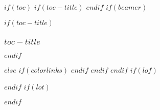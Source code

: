 
$if(toc)$
$if(toc-title)$
\renewcommand*\contentsname{$toc-title$}
$endif$
$if(beamer)$
\begin{frame}[allowframebreaks]
$if(toc-title)$
  \frametitle{$toc-title$}
$endif$
  \tableofcontents[hideallsubsections]
\end{frame}
$else$
{
$if(colorlinks)$
\hypersetup{linkcolor=$if(toccolor)$$toccolor$$else$$endif$}
$endif$
\setcounter{tocdepth}{$toc-depth$}
\tableofcontents
}
$endif$
$endif$
$if(lof)$
\listoffigures
$endif$
$if(lot)$
\listoftables
$endif$